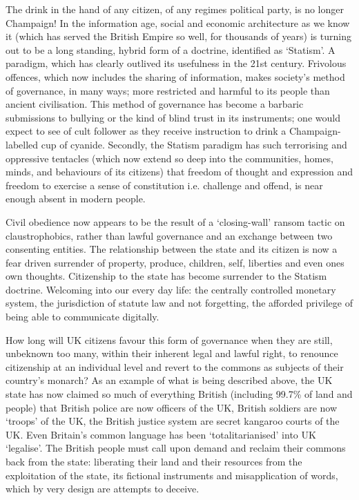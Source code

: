 \documentclass[letterpaper,10pt,openany,oneside,english]{sphinxmanual}
\begin{document}
The drink in the hand of any citizen, of any regimes political party, is no longer Champaign! In the information age, social and economic architecture as we know it (which has served the British Empire so well, for thousands of years) is turning out to be a long standing, hybrid form of a doctrine, identified as ‘Statism’. A paradigm, which has clearly outlived its usefulness in the 21st century. Frivolous offences, which now includes the sharing of information, makes society’s method of governance, in many ways; more restricted and harmful to its people than ancient civilisation. This method of governance has become a barbaric submissions to bullying or the kind of blind trust in its instruments; one would expect to see of cult follower as they receive instruction to drink a Champaign-labelled cup of cyanide. Secondly, the Statism paradigm has such terrorising and oppressive tentacles (which now extend so deep into the communities, homes, minds, and behaviours of its citizens) that freedom of thought and expression and freedom to exercise a sense of constitution i.e. challenge and offend, is near enough absent in modern people.

Civil obedience now appears to be the result of a ‘closing-wall’ ransom tactic on claustrophobics, rather than lawful governance and an exchange between two consenting entities. The relationship between the state and its citizen is now a fear driven surrender of property, produce, children, self, liberties and even ones own thoughts. Citizenship to the state has become surrender to the Statism doctrine. Welcoming into our every day life: the centrally controlled monetary system, the jurisdiction of statute law and not forgetting, the afforded privilege of being able to communicate digitally.

How long will UK citizens favour this form of governance when they are still, unbeknown too many, within their inherent legal and lawful right, to renounce citizenship at an individual level and revert to the commons as subjects of their country’s monarch? As an example of what is being described above, the UK state has now claimed so much of everything British (including 99.7\% of land and people) that British police are now officers of the UK, British soldiers are now ‘troops’ of the UK, the British justice system are secret kangaroo courts of the UK. Even Britain’s common language has been ‘totalitarianised’ into UK ‘legalise’. The British people must call upon demand and reclaim their commons back from the state: liberating their land and their resources from the exploitation of the state, its fictional instruments and misapplication of words, which by very design are attempts to deceive.
\end{document}

